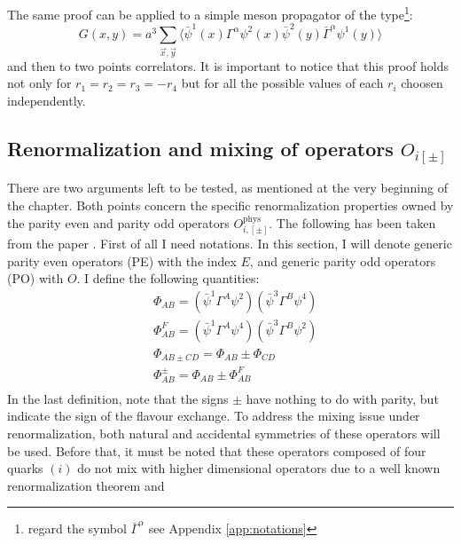 \documentclass[english, LaM, oneside, noexaminfo]{sapthesis}
\newcommand{\la}{\langle}
\newcommand{\ra}{\rangle}
\begin{document}
The same proof can be applied to a simple meson propagator of the type\footnote{regard the symbol $\bar\Gamma^\alpha$ see Appendix \ref{app:notations}}:
\begin{equation*}
    G(x,y)=a^3\sum_{\vec x, \vec y} \Big\la \bar \psi^1 (x) \Gamma^\alpha \psi^2 (x) \bar\psi^2 (y) \bar\Gamma^\alpha \psi^1 (y) \Big\ra 
\end{equation*}
and then to two points correlators.
It is important to notice that this proof holds not only for $r_1=r_2=r_3=-r_4$ but for all the possible values of each $r_i$ choosen independently.


\subsection{Renormalization and mixing of operators $O_{i[\pm]}$}\label{sec:renormalization-properties}
\noindent
There are two arguments left to be tested, as mentioned at the very beginning of the chapter.
Both points concern the specific renormalization properties owned by the parity even and parity odd operators $O_{i,[\pm]}^\text{phys}$.
The following has been taken from the paper \cite{DoniniMartinelliOperators}.
\newline
First of all I need notations.
In this section, I will denote generic parity even operators (PE) with the index ${E}$, and generic parity odd operators (PO) with ${O}$.
I define the following quantities:
\begin{equation*}
    \begin{split}
        & \Phi_{AB} = \left( \bar \psi^1 \Gamma^A \psi^2 \right) \left( \bar \psi^3 \Gamma^B \psi^4 \right) \\
        & \Phi_{AB}^F = \left( \bar \psi^1 \Gamma^A \psi^4 \right) \left( \bar \psi^3 \Gamma^B \psi^2 \right) \\
        & \Phi_{AB \pm CD} = \Phi_{AB} \pm \Phi_{CD} \\
        & \Phi_{AB}^\pm = \Phi_{AB} \pm \Phi_{AB}^F \\
    \end{split}
\end{equation*}
In the last definition, note that the signs $\pm$ have nothing to do with parity, but indicate the sign of the flavour exchange.
\newline
To address the mixing issue under renormalization, both natural and accidental symmetries of these operators will be used.
Before that, it must be noted that these operators composed of four quarks
$(i)$ do not mix with higher dimensional operators due to a well known renormalization theorem \cite{Collins} and
\end{document}
